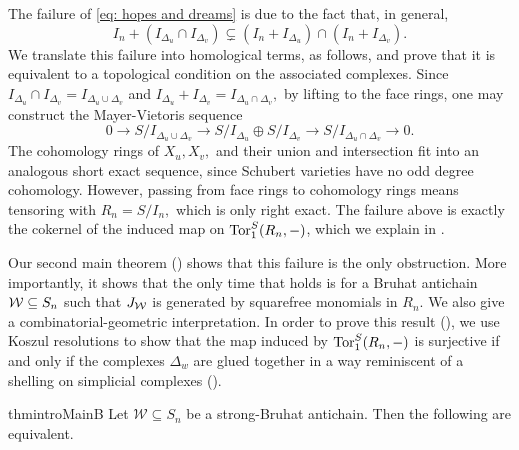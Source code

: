 The failure of \eqref{eq: hopes and dreams} is due to the fact that, in general, 
\[
I_n + (I_{\Delta_u}\cap I_{\Delta_v}) \subsetneq (I_n + I_{\Delta_u}) \cap (I_n + I_{\Delta_v}).
\]
We translate this failure into homological terms, as follows, and prove that it is equivalent to a topological condition on the associated complexes. Since $I_{\Delta_u}\cap I_{\Delta_v} = I _{\Delta_u\cup\Delta_v}$ and $I_{\Delta_u}+I_{\Delta_v} = I_{\Delta_u\cap\Delta_v},$ by lifting to the face rings, one may construct the Mayer-Vietoris sequence
\[
0\longrightarrow
S/I_{\Delta_u\cup\Delta_v}
\longrightarrow
S/I_{\Delta_u}\oplus S/I_{\Delta_v}
\longrightarrow
S/I_{\Delta_u\cap\Delta_v}
\longrightarrow
0.
\]
The cohomology rings of $X_u,X_v,$ and their union and intersection fit into an analogous short exact sequence, since Schubert varieties have no odd degree cohomology.
However, passing from face rings to cohomology rings means tensoring with $R_n = S/I_n,$ which is only right exact. The failure above is exactly the cokernel of the induced map on $\operatorname{Tor}_1^S(R_n,-)$, which we explain in .

Our second main theorem () shows that this failure is the only obstruction. More importantly, it shows that the only time that  holds is for a Bruhat antichain $\mathcal{W}\subseteq S_n$ such that $J_{\mathcal{W}}$ is generated by squarefree monomials in $R_n.$ We also give a combinatorial-geometric interpretation.  
In order to prove this result (), we use Koszul resolutions to show that the map induced by $\operatorname{Tor}_1^S(R_n,-)$ is surjective if and only if the complexes $\Delta_w$ are glued together in a way reminiscent of a shelling on simplicial complexes ().

\begin{restatable}[]{thmintro}{MainB}
\label{thm:main-B}
Let \(\mathcal W\subseteq S_n\) be a strong-Bruhat antichain. Then the following are equivalent.

\end{restatable}

